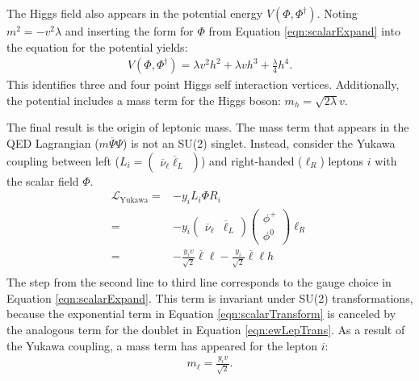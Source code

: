 The Higgs field also appears in the potential energy $V(\Phi,\Phi^\dagger)$.
Noting $m^2=-v^2\lambda$ and inserting the form for $\Phi$ from Equation \ref{eqn:scalarExpand} into the equation for the potential yields:
\begin{equation}\begin{split}
    V(\Phi,\Phi^\dagger)=\lambda v^2h^2+\lambda vh^3+\frac{\lambda}{4}h^4.
\end{split}\end{equation}
This identifies three and four point Higgs self interaction vertices.
Additionally, the potential includes a mass term for the Higgs boson: $m_h=\sqrt{2\lambda}v$.

The final result is the origin of leptonic mass.
The mass term that appears in the QED Lagrangian ($m\overline{\Psi}\Psi$) is not an SU(2) singlet.
Instead, consider the Yukawa coupling between left ($L_i=\begin{pmatrix}\overline{\nu}_\ell\overline{\ell}_L\end{pmatrix}$) and right-handed ($\ell_R$) leptons $i$ with the scalar field $\Phi$.
\begin{equation}\begin{split}\label{eqn:leptonYukawaLagrangian}
        \mathcal{L}_{\text{Yukawa}}=&-y_i L_i\Phi R_i \\
        =&-y_i\begin{pmatrix}\overline{\nu}_\ell&\overline{\ell}_L\end{pmatrix}\begin{pmatrix}\phi^+\\\phi^0\end{pmatrix}\ell_R \\
        =&-\frac{y_iv}{\sqrt{2}}\overline{\ell}\ell-\frac{y_i}{\sqrt{2}}\overline{\ell}\ell h \\
\end{split}\end{equation}
The step from the second line to third line corresponds to the gauge choice in Equation \ref{eqn:scalarExpand}.
This term is invariant under SU(2) transformations, because the exponential term in Equation \ref{eqn:scalarTransform} is canceled by the analogous term for the doublet in Equation \ref{eqn:ewLepTrans}.
As a result of the Yukawa coupling, a mass term has appeared for the lepton $i$:
\begin{equation}\begin{split}\label{eqn:yukawaMass}
    m_\ell=\frac{y_iv}{\sqrt{2}}.
\end{split}\end{equation}
